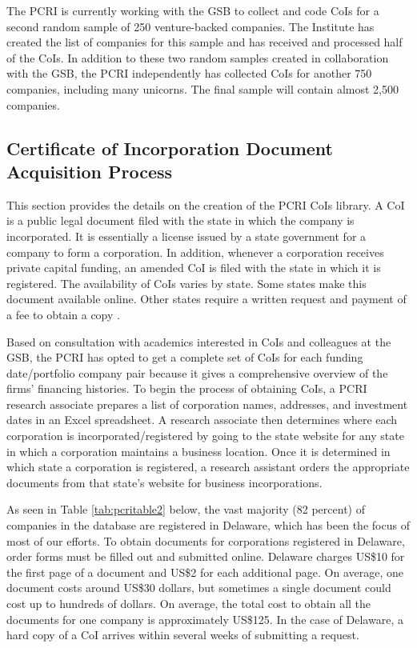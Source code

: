 The PCRI is currently working with the GSB to collect and code CoIs for a second random sample of 250 venture-backed companies. The Institute has created the list of companies for this sample and has received and processed half of the CoIs. In addition to these two random samples created in collaboration with the GSB, the PCRI independently has collected CoIs for another 750 companies, including many unicorns. The final sample will contain almost 2,500 companies.

\hypertarget{certificate-of-incorporation-document-acquisition-process}{%
\subsection{Certificate of Incorporation Document Acquisition Process}\label{certificate-of-incorporation-document-acquisition-process}}

This section provides the details on the creation of the PCRI CoIs library. A CoI is a public legal document filed with the state in which the company is incorporated. It is essentially a license issued by a state government for a company to form a corporation. In addition, whenever a corporation receives private capital funding, an amended CoI is filed with the state in which it is registered. The availability of CoIs varies by state. Some states make this document available online. Other states require a written request and payment of a fee to obtain a copy \citep{masters2020}.

Based on consultation with academics interested in CoIs and colleagues at the GSB, the PCRI has opted to get a complete set of CoIs for each funding date/portfolio company pair because it gives a comprehensive overview of the firms' financing histories. To begin the process of obtaining CoIs, a PCRI research associate prepares a list of corporation names, addresses, and investment dates in an Excel spreadsheet. A research associate then determines where each corporation is incorporated/registered by going to the state website for any state in which a corporation maintains a business location. Once it is determined in which state a corporation is registered, a research assistant orders the appropriate documents from that state's website for business incorporations.

As seen in Table \ref{tab:pcritable2} below, the vast majority (82 percent) of companies in the database are registered in Delaware, which has been the focus of most of our efforts. To obtain documents for corporations registered in Delaware, order forms must be filled out and submitted online. Delaware charges US\$10 for the first page of a document and US\$2 for each additional page. On average, one document costs around US\$30 dollars, but sometimes a single document could cost up to hundreds of dollars. On average, the total cost to obtain all the documents for one company is approximately US\$125. In the case of Delaware, a hard copy of a CoI arrives within several weeks of submitting a request.

